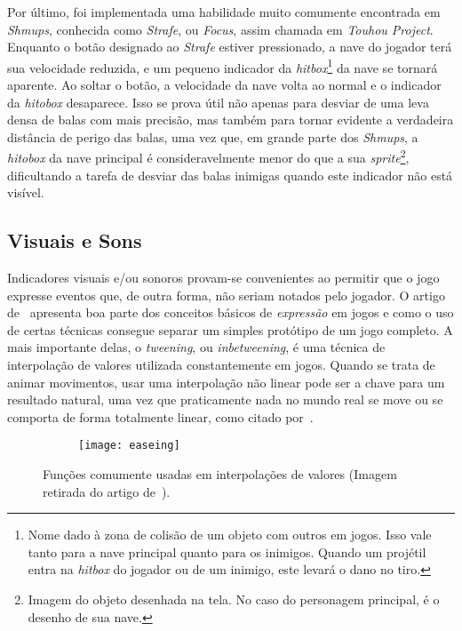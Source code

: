 Por último, foi implementada uma habilidade muito comumente encontrada em \textit{Shmups}, conhecida como \textit{Strafe}, ou \textit{Focus}, assim chamada em \textit{Touhou Project}. Enquanto o botão designado ao \textit{Strafe} estiver pressionado, a nave do jogador terá sua velocidade reduzida, e um pequeno indicador da \textit{hitbox}\footnote{
    Nome dado à zona de colisão de um objeto com outros em jogos. Isso vale tanto para a nave principal quanto para os inimigos. Quando um projétil entra na \textit{hitbox} do jogador ou de um inimigo, este levará o dano no tiro.
} da nave se tornará aparente. Ao soltar o botão, a velocidade da nave volta ao normal e o indicador da \textit{hitobox} desaparece. Isso se prova útil não apenas para desviar de uma leva densa de balas com mais precisão, mas também para tornar evidente a verdadeira distância de perigo das balas, uma vez que, em grande parte dos \textit{Shmups}, a \textit{hitobox} da nave principal é consideravelmente menor do que a sua \textit{sprite}\footnote{
    Imagem do objeto desenhada na tela. No caso do personagem principal, é o desenho de sua nave.
}, dificultando a tarefa de desviar das balas inimigas quando este indicador não está visível.

\subsection{Visuais e Sons}

Indicadores visuais e/ou sonoros provam-se convenientes ao permitir que o jogo expresse eventos que, de outra forma, não seriam notados pelo jogador. O artigo de~\citet{VideoGameJuice} apresenta boa parte dos conceitos básicos de \textit{expressão} em jogos e como o uso de certas técnicas consegue separar um simples protótipo de um jogo completo. A mais importante delas, o \textit{tweening}, ou \textit{inbetweening}, é uma técnica de interpolação de valores utilizada constantemente em jogos. Quando se trata de animar movimentos, usar uma interpolação não linear pode ser a chave para um resultado natural, uma vez que praticamente nada no mundo real se move ou se comporta de forma totalmente linear, como citado por~\cite{VideoGameJuice}.

\begin{figure}
    \centering

    \begin{subfigure}{.9\textwidth}
        \centering
        \texttt{[image: easeing]}
    \end{subfigure}

    \caption{Funções comumente usadas em interpolações de valores\label{fig:subfigures} (Imagem retirada do artigo de~\cite{VideoGameJuice}).}
\end{figure}

